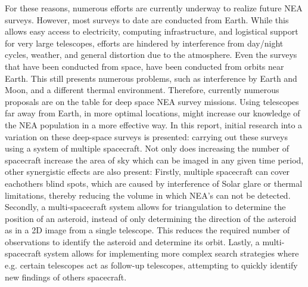 For these reasons, numerous efforts are currently underway to realize future NEA surveys. However, most surveys to date are conducted from Earth. While this allows easy access to electricity, computing infrastructure, and logistical support for very large telescopes, efforts are hindered by interference from day/night cycles, weather, and general distortion due to the atmosphere. Even the surveys that have been conducted from space, have been conducted from orbits near Earth. This still presents numerous problems, such as interference by Earth and Moon, and a different thermal environment. Therefore, currently numerous proposals are on the table for deep space NEA survey missions. Using telescopes far away from Earth, in more optimal locations, might increase our knowledge of the NEA population in a more effective way. In this report, initial research into a variation on these deep-space surveys is presented: carrying out these surveys using a system of multiple spacecraft. Not only does increasing the number of spacecraft increase the area of sky which can be imaged in any given time period, other synergistic effects are also present: Firstly, multiple spacecraft can cover eachothers blind spots, which are caused by interference of Solar glare or thermal limitations, thereby reducing the volume in which NEA's can not be detected. Secondly, a multi-spacecraft system allows for triangulation to determine the position of an asteroid, instead of only determining the direction of the asteroid as in a 2D image from a single telescope. This reduces the required number of observations to identify the asteroid and determine its orbit. Lastly, a multi-spacecraft system allows for implementing more complex search strategies where e.g. certain telescopes act as follow-up telescopes, attempting to quickly identify new findings of others spacecraft. \\

